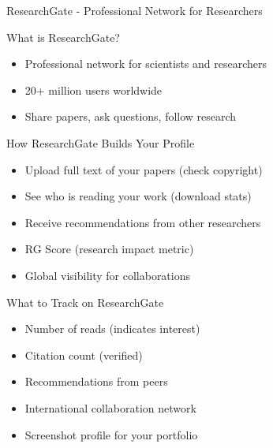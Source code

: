 \documentclass[11pt]{beamer}
\begin{document}
				\begin{frame}{ResearchGate - Professional Network for Researchers}
					\scriptsize
					\begin{block}{What is ResearchGate?}
						\begin{itemize}
							\item Professional network for scientists and researchers
							\item 20+ million users worldwide
							\item Share papers, ask questions, follow research
						\end{itemize}
					\end{block}
					\begin{block}{How ResearchGate Builds Your Profile}
						\begin{itemize}
							\item Upload full text of your papers (check copyright)
							\item See who is reading your work (download stats)
							\item Receive recommendations from other researchers
							\item RG Score (research impact metric)
							\item Global visibility for collaborations
						\end{itemize}
					\end{block}
					\begin{block}{What to Track on ResearchGate}
						\begin{itemize}
							\item Number of reads (indicates interest)
							\item Citation count (verified)
							\item Recommendations from peers
							\item International collaboration network
							\item Screenshot profile for your portfolio
						\end{itemize}
					\end{block}
				\end{frame}
				
\end{document}

